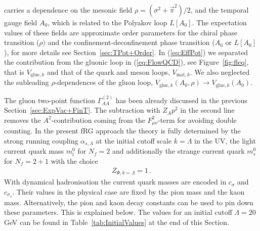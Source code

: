 \documentclass[%
reprint,
superscriptaddress,
showpacs,preprintnumbers,
 amsmath,amssymb,
 aps,
prd,
]{revtex4-1}
\def\eq#1{(\ref{#1})}
\def\fig#1{Figure~\ref{#1}}
\def\sec#1{Section~\ref{#1}}
\begin{document}
%
carries a dependence on the mesonic field
$\rho= (\sigma^2 +\vec \pi^2)/2$, and the temporal gauge field $A_0$,
which is related to the Polyakov loop $L[A_0]$. The expectation values
of these fields are approximate order parameters for the chiral phase
transition ($\rho)$ and the confinement-deconfinement phase transition
($A_0$ or $L[A_0]$), for more details see \sec{sec:TPot+Order}. In
\eq{eq:EffPot} we separated the contribution from the gluonic loop in
\eq{eq:FlowQCD}, see \fig{fig:fleq}, that is $V_{\textrm{glue},k}$ and
that of the quark and meson loops, $V_{\textrm{mat},k}$. We also
neglected the subleading $\rho$-dependences of the gluon loop,
$V_{\textrm{glue},k}(A_0,\rho)\to V_{\textrm{glue},k}(A_0) $.

The gluon two-point function $\Gamma^{(2)}_{AA}$ has been already
discussed in the previous \sec{sec:ExpVac+FinT}. The subtraction with
$Z_A p^2$ in the second line removes the $A^2$-contribution coming
from the $F_{\mu\nu}^2$-term for avoiding double counting. In the
present fRG approach the theory is fully determined by the strong
running coupling $\alpha_{s,\Lambda}$ at the initial cutoff scale
$k=\Lambda$ in the UV, the light current quark mass $m_l^0$ for
$N_f=2$ and additionally the strange current quark $m_s^0$ for
$N_f=2+1$ with the choice
%
\begin{align}\label{eq:Zin1}
  Z_{\Phi,k=\Lambda} = 1\,.
\end{align}
%
With dynamical hadronisation the current quark masses are encoded in
$c_\sigma$ and $c_{\sigma_s}$. Their values in the physical case are
fixed by the pion mass and the kaon mass. Alternatively, the pion and
kaon decay constants can be used to pin down these parameters. This is
explained below. The values for an initial cutoff $\Lambda=20\,$GeV
can be found in Table~\ref{tab:InitialValues} at the end of this
Section.
\end{document}
